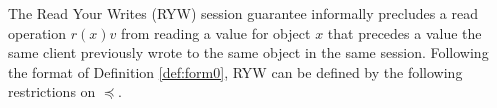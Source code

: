 \documentclass[conference]{IEEEtran}
\begin{document}
	The Read Your Writes (RYW) session guarantee informally precludes a read operation $r(x)v$  from reading a value for object $x$ that precedes a value the same client previously wrote to the same object in the same session.
	Following the format of Definition \ref{def:form0}, RYW can be defined by the following restrictions on $\preccurlyeq$.
	
\end{document}
